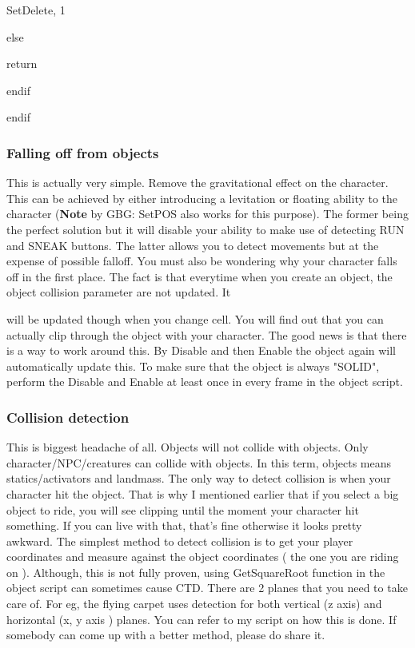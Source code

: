 SetDelete, 1

else

return

endif

endif

\hypertarget{falling-off-from-objects}{%
\subsubsection{\texorpdfstring{Falling off from objects
}{Falling off from objects }}\label{falling-off-from-objects}}

This is actually very simple. Remove the gravitational effect on the
character. This can be achieved by either introducing a levitation or
floating ability to the character (\textbf{Note} by GBG: SetPOS also
works for this purpose). The former being the perfect solution but it
will disable your ability to make use of detecting RUN and SNEAK
buttons. The latter allows you to detect movements but at the expense of
possible falloff. You must also be wondering why your character falls
off in the first place. The fact is that everytime when you create an
object, the object collision parameter are not updated. It

will be updated though when you change cell. You will find out that you
can actually clip through the object with your character. The good news
is that there is a way to work around this. By Disable and then Enable
the object again will automatically update this. To make sure that the
object is always "SOLID", perform the Disable and Enable at least once
in every frame in the object script.

\hypertarget{collision-detection}{%
\subsubsection{\texorpdfstring{Collision detection
}{Collision detection }}\label{collision-detection}}

This is biggest headache of all. Objects will not collide with objects.
Only character/NPC/creatures can collide with objects. In this term,
objects means statics/activators and landmass. The only way to detect
collision is when your character hit the object. That is why I mentioned
earlier that if you select a big object to ride, you will see clipping
until the moment your character hit something. If you can live with
that, that's fine otherwise it looks pretty awkward. The simplest method
to detect collision is to get your player coordinates and measure
against the object coordinates ( the one you are riding on ). Although,
this is not fully proven, using GetSquareRoot function in the object
script can sometimes cause CTD. There are 2 planes that you need to take
care of. For eg, the flying carpet uses detection for both vertical (z
axis) and horizontal (x, y axis ) planes. You can refer to my script on
how this is done. If somebody can come up with a better method, please
do share it.

